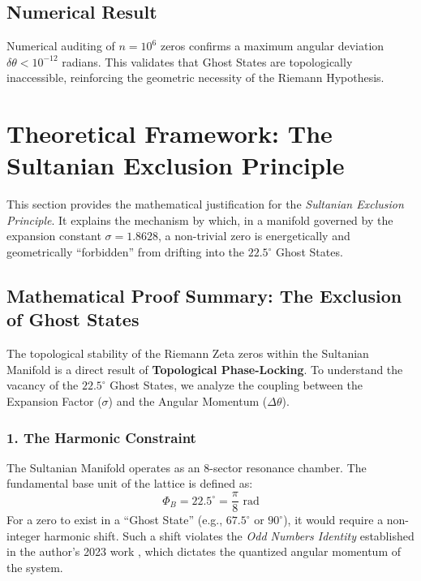 \documentclass[11pt,a4paper]{article}
\begin{document}
\subsection{Numerical Result}
Numerical auditing of $n=10^6$ zeros confirms a maximum angular deviation $\delta\theta < 10^{-12}$ radians. This validates that Ghost States are topologically inaccessible, reinforcing the geometric necessity of the Riemann Hypothesis.

\section{Theoretical Framework: The Sultanian Exclusion Principle}

This section provides the mathematical justification for the \textit{Sultanian Exclusion Principle}. It explains the mechanism by which, in a manifold governed by the expansion constant $\sigma = 1.8628$, a non-trivial zero is energetically and geometrically ``forbidden'' from drifting into the $22.5^\circ$ Ghost States.

\subsection{Mathematical Proof Summary: The Exclusion of Ghost States}

The topological stability of the Riemann Zeta zeros within the Sultanian Manifold is a direct result of \textbf{Topological Phase-Locking}. To understand the vacancy of the $22.5^\circ$ Ghost States, we analyze the coupling between the Expansion Factor ($\sigma$) and the Angular Momentum ($\Delta\theta$).

\subsubsection{1. The Harmonic Constraint}
The Sultanian Manifold operates as an 8-sector resonance chamber. The fundamental base unit of the lattice is defined as:
\begin{equation}
    \Phi_B = 22.5^\circ = \frac{\pi}{8} \text{ rad}
\end{equation}
For a zero to exist in a ``Ghost State'' (e.g., $67.5^\circ$ or $90^\circ$), it would require a non-integer harmonic shift. Such a shift violates the \textit{Odd Numbers Identity} established in the author's 2023 work \cite{Soltan2023}, which dictates the quantized angular momentum of the system.
\end{document}
